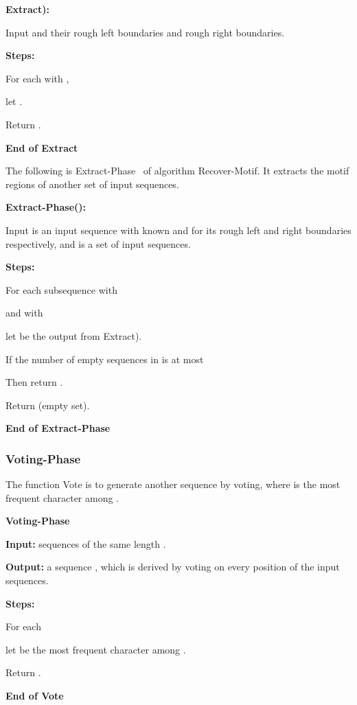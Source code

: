 \documentclass[11pt]{article}
\newcommand{\algmnam}{Recover-Motif}
\newcommand{\phasetwo}{Extract-Phase}
\newcommand{\phasethree}{Voting-Phase}
\begin{document}
{\bf Extract):}

Input  and their rough left
boundaries and rough right boundaries.


{\bf Steps:}

\qquad For each  with ,

\qquad\qquad let .

\qquad  Return .

{\bf End of Extract}

\vskip 10pt



The following is \phasetwo~ of algorithm \algmnam. It  extracts the
motif regions of another set  of input sequences.

{\bf \phasetwo():}

Input  is an input sequence with known  and
 for its rough left and right boundaries
respectively, and  is a set of
input sequences.


{\bf Steps:}

\qquad For each subsequence  with 

\qquad and  with 

\qquad\qquad let  be the output
from Extract).

\qquad\qquad  If  the number of empty sequences in  is at most 


\qquad\qquad Then return .


\qquad Return  (empty set).

{\bf End of \phasetwo~}


\subsubsection{\phasethree}

The function Vote is to generate
another sequence  by voting, where  is the most frequent
character among .

 \vskip 10pt

{\bf \phasethree}

{\bf Input:}  sequences  of the same length .


{\bf Output:} a sequence , which is derived by voting on every
position of the input sequences.


 {\bf Steps:}



\qquad For each 

\qquad\qquad let  be the most frequent character among
.

\qquad Return .

{\bf End of Vote}
\end{document}
